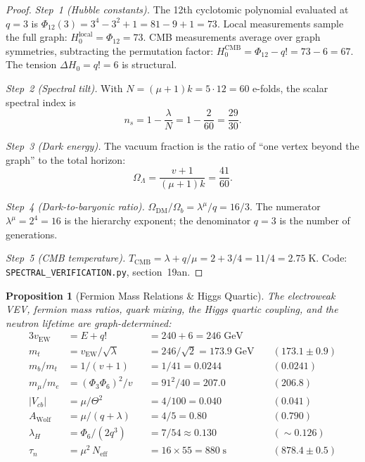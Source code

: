 \documentclass[12pt,a4paper]{article}
\newtheorem{proposition}[theorem]{Proposition}
\begin{document}
\begin{proof}
\emph{Step~1 (Hubble constants).}
The 12th cyclotomic polynomial evaluated at $q=3$ is
$\Phi_{12}(3) = 3^4 - 3^2 + 1 = 81 - 9 + 1 = 73$.
Local measurements sample the full graph: $H_0^{\mathrm{local}} = \Phi_{12} = 73$.
CMB measurements average over graph symmetries, subtracting
the permutation factor: $H_0^{\mathrm{CMB}} = \Phi_{12} - q! = 73 - 6 = 67$.
The tension $\Delta H_0 = q! = 6$ is structural.

\emph{Step~2 (Spectral tilt).}
With $N = (\mu+1)k = 5 \cdot 12 = 60$ e-folds, the scalar spectral index is
\[
  n_s = 1 - \frac{\lambda}{N} = 1 - \frac{2}{60} = \frac{29}{30}.
\]

\emph{Step~3 (Dark energy).}
The vacuum fraction is the ratio of ``one vertex beyond the
graph'' to the total horizon:
\[
  \Omega_\Lambda = \frac{v + 1}{(\mu+1)k} = \frac{41}{60}.
\]

\emph{Step~4 (Dark-to-baryonic ratio).}
$\Omega_{\mathrm{DM}}/\Omega_b = \lambda^\mu/q = 16/3$.
The numerator $\lambda^\mu = 2^4 = 16$ is the hierarchy exponent;
the denominator $q = 3$ is the number of generations.

\emph{Step~5 (CMB temperature).}
$T_{\mathrm{CMB}} = \lambda + q/\mu = 2 + 3/4 = 11/4 = 2.75\;\text{K}$.
Code: \texttt{SPECTRAL\_VERIFICATION.py}, section~19an.
\end{proof}

\begin{proposition}[Fermion Mass Relations \& Higgs Quartic]\label{prop:fermion-masses}
The electroweak VEV, fermion mass ratios, quark mixing, the Higgs quartic
coupling, and the neutron lifetime are graph-determined:
\begin{alignat*}{3}
  v_{\mathrm{EW}} &= E + q!
    &&= 240 + 6 = 246\;\mathrm{GeV} && \\
  m_t &= v_{\mathrm{EW}}/\!\sqrt{\lambda}
    &&= 246/\!\sqrt{2} = 173.9\;\mathrm{GeV}
    &\;& (173.1 \pm 0.9) \\
  m_b/m_t &= 1/(v{+}1)
    &&= 1/41 = 0.0244 && (0.0241) \\
  m_\mu/m_e &= (\Phi_3\Phi_6)^2/v
    &&= 91^2/40 = 207.0 && (206.8) \\
  |V_{cb}| &= \mu/\Theta^2
    &&= 4/100 = 0.040 && (0.041) \\
  A_{\mathrm{Wolf}} &= \mu/(q{+}\lambda)
    &&= 4/5 = 0.80 && (0.790) \\
  \lambda_H &= \Phi_6/(2q^3)
    &&= 7/54 \approx 0.130 && (\sim 0.126) \\
  \tau_n &= \mu^2\,N_{\mathrm{eff}}
    &&= 16 \times 55 = 880\;\mathrm{s}
    && (878.4 \pm 0.5)
\end{alignat*}
\end{proposition}
\end{document}
